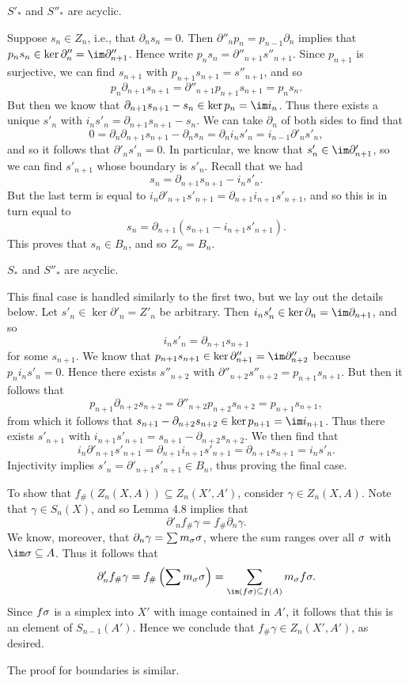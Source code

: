 \documentclass[../../solutions.tex]{subfiles}
\begin{document}
\begin{exercise}
\begin{case}
$S'_*$ and $S''_*$ are acyclic. 
\end{case}

Suppose $s_n\in Z_n$, i.e., that $\partial_ns_n=0$. 
Then $\partial''_np_n=p_{n-1}\partial_n$ implies that $p_ns_n\in\ker\partial''_n=\im\partial''_{n+1}$. 
Hence write $p_ns_n=\partial''_{n+1}s''_{n+1}$. 
Since $p_{n+1}$ is surjective, we can find $s_{n+1}$ with $p_{n+1}s_{n+1}=s''_{n+1}$, and so \[p_n\partial_{n+1}s_{n+1}=\partial''_{n+1}p_{n+1}s_{n+1}=p_ns_n.\]
But then we know that $\partial_{n+1}s_{n+1}-s_n\in\ker p_n=\im i_n$. 
Thus there exists a unique $s'_n$ with $i_ns'_n=\partial_{n+1}s_{n+1}-s_n$. 
We can take $\partial_n$ of both sides to find that \[0=\partial_n\partial_{n+1}s_{n+1}-\partial_ns_n=\partial_ni_ns'_n=i_{n-1}\partial'_ns'_n,\] and so it follows that $\partial'_ns'_n=0$. 
In particular, we know that $s'_n\in\im\partial'_{n+1}$, so we can find $s'_{n+1}$ whose boundary is $s'_n$. 
Recall that we had \[s_n=\partial_{n+1}s_{n+1}-i_ns'_n.\]
But the last term is equal to $i_n\partial'_{n+1}s'_{n+1}=\partial_{n+1}i_{n+1}s'_{n+1}$, and so this is in turn equal to \[s_n=\partial_{n+1}(s_{n+1}-i_{n+1}s'_{n+1}).\] 
This proves that $s_n\in B_n$, and so $Z_n=B_n$. 

\begin{case}
$S_*$ and $S''_*$ are acyclic. 
\end{case}

This final case is handled similarly to the first two, but we lay out the details below. 
Let $s'_n\in\ker\partial'_n=Z'_n$ be arbitrary. 
Then $i_ns'_n\in\ker\partial_n=\im\partial_{n+1}$, and so \[i_ns'_n=\partial_{n+1}s_{n+1}\] for some $s_{n+1}$. 
We know that $p_{n+1}s_{n+1}\in\ker\partial''_{n+1}=\im\partial''_{n+2}$ because $p_ni_ns'_n=0$. 
Hence there exists $s''_{n+2}$ with $\partial''_{n+2}s''_{n+2}=p_{n+1}s_{n+1}$. 
But then it follows that \[p_{n+1}\partial_{n+2}s_{n+2}=\partial''_{n+2}p_{n+2}s_{n+2}=p_{n+1}s_{n+1},\] from which it follows that $s_{n+1}-\partial_{n+2}s_{n+2}\in\ker p_{n+1}=\im i_{n+1}$. 
Thus there exists $s'_{n+1}$ with $i_{n+1}s'_{n+1}=s_{n+1}-\partial_{n+2}s_{n+2}$.
We then find that \[i_n\partial'_{n+1}s'_{n+1}=\partial_{n+1}i_{n+1}s'_{n+1}=\partial_{n+1}s_{n+1}=i_ns'_n.\]
Injectivity implies $s'_n=\partial'_{n+1}s'_{n+1}\in B_n$, thus proving the final case. 
\end{exercise}

\begin{exercise} \leavevmode
To show that $f_\#(Z_n(X,A))\subseteq Z_n(X',A')$, consider $\gamma\in Z_n(X,A)$. 
Note that $\gamma\in S_n(X)$, and so Lemma 4.8 implies that \[\partial'_nf_\#\gamma=f_\#\partial_n\gamma.\] 
We know, moreover, that $\partial_n\gamma=\sum m_\sigma\sigma$, where the sum ranges over all $\sigma$ with $\im\sig\subseteq A$. 
Thus it follows that \[\partial'_nf_\#\gamma=f_\#\left(\sum m_\sig\sig\right)=\sum_{\im(f\sig)\subseteq f(A)} m_\sig f\sig.\] 
Since $f\sigma$ is a simplex into $X'$ with image contained in $A'$, it follows that this is an element of $S_{n-1}(A')$. 
Hence we conclude that $f_\#\gamma\in Z_n(X',A')$, as desired. 

The proof for boundaries is similar. 
\end{exercise}
\end{document}
